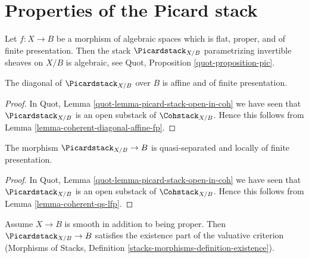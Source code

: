 \section{Properties of the Picard stack}
\label{section-picard-stack}

\noindent
Let $f : X \to B$ be a morphism of algebraic spaces which is flat,
proper, and of finite presentation. Then the stack
$\Picardstack_{X/B}$ parametrizing invertible sheaves on $X/B$
is algebraic, see Quot, Proposition \ref{quot-proposition-pic}.

\begin{lemma}
\label{lemma-pic-diagonal-affine-fp}
The diagonal of $\Picardstack_{X/B}$ over $B$ is affine
and of finite presentation.
\end{lemma}

\begin{proof}
In Quot, Lemma \ref{quot-lemma-picard-stack-open-in-coh} we have seen that
$\Picardstack_{X/B}$ is an open substack of
$\Cohstack_{X/B}$. Hence this follows from
Lemma \ref{lemma-coherent-diagonal-affine-fp}.
\end{proof}

\begin{lemma}
\label{lemma-pic-qs-lfp}
The morphism $\Picardstack_{X/B} \to B$ is quasi-separated and
locally of finite presentation.
\end{lemma}

\begin{proof}
In Quot, Lemma \ref{quot-lemma-picard-stack-open-in-coh} we have seen that
$\Picardstack_{X/B}$ is an open substack of
$\Cohstack_{X/B}$. Hence this follows from
Lemma \ref{lemma-coherent-qs-lfp}.
\end{proof}

\begin{lemma}
\label{lemma-pic-existence-part}
Assume $X \to B$ is smooth in addition to being proper.
Then $\Picardstack_{X/B} \to B$ satisfies the existence part
of the valuative criterion (Morphisms of Stacks, Definition
\ref{stacks-morphisms-definition-existence}).
\end{lemma}

